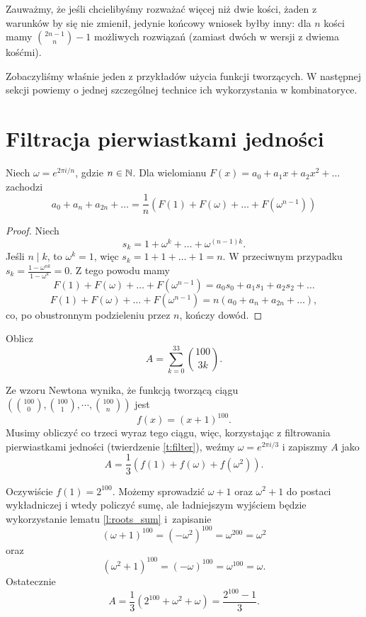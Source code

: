 \documentclass{scrartcl}
\begin{document}
    Zauważmy, że jeśli chcielibyśmy rozważać więcej niż dwie kości, żaden z warunków by się nie zmienił, jedynie końcowy wniosek byłby inny: dla $n$ kości mamy $\binom{2n - 1}{n} - 1$ możliwych rozwiązań (zamiast dwóch w wersji z dwiema kośćmi).

    Zobaczyliśmy właśnie jeden z przykładów użycia funkcji tworzących. W następnej sekcji powiemy o jednej szczególnej technice ich wykorzystania w kombinatoryce.

\section{Filtracja pierwiastkami jedności}
    \begin{theorem}
        \label{t:filter}
        Niech $\omega = e^{2\pi i/n}$, gdzie $n \in \mathbb N$. Dla wielomianu $F(x) = a_0 + a_1x + a_2x^2 + \ldots$ zachodzi
        $$ a_0 + a_n + a_{2n} + \ldots = \frac{1}{n}\left(F(1) + F(\omega) + \ldots + F(\omega^{n - 1})\right) $$
    \end{theorem}
    \begin{proof}
        Niech
        $$ s_k = 1 + \omega^k + \ldots + \omega^{(n - 1)k}. $$
        Jeśli $n \mid k$, to $\omega^k = 1$, więc $s_k = 1 + 1 + \ldots + 1 = n$. W przeciwnym przypadku $s_k = \frac{1 - \omega^{nk}}{1 - \omega^k} = 0$.
        Z tego powodu mamy
        $$ F(1) + F(\omega) + \ldots + F(\omega^{n - 1}) = a_0s_0 + a_1s_1 + a_2s_2 + \ldots $$
        $$ F(1) + F(\omega) + \ldots + F(\omega^{n - 1}) = n(a_0 + a_n + a_{2n} + \ldots), $$
        co, po obustronnym podzieleniu przez $n$, kończy dowód.
    \end{proof}

    \begin{example}
        Oblicz $$ A = \sum_{k = 0}^{33} \binom{100}{3k}. $$
    \end{example}
    \begin{solution}
        Ze wzoru Newtona wynika, że funkcją tworzącą ciągu $\left(\binom{100}{0}, \binom{100}{1}, \cdots, \binom{100}{n}\right)$ jest
        $$ f(x) = (x + 1)^{100}. $$
        Musimy obliczyć co trzeci wyraz tego ciągu, więc, korzystając z filtrowania pierwiastkami jedności (twierdzenie \ref{t:filter}), weźmy $\omega = e^{2\pi i /3}$ i zapiszmy $A$ jako
        $$ A = \frac{1}{3}\left(f(1) + f(\omega) + f(\omega^2)\right). $$

        Oczywiście $f(1) = 2^{100}$. Możemy sprowadzić $\omega + 1$ oraz $\omega^2 + 1$ do postaci wykładniczej i wtedy policzyć sumę, ale ładniejszym wyjściem będzie wykorzystanie lematu \ref{l:roots_sum} i~zapisanie
        $$ (\omega + 1)^{100} = (-\omega^2)^{100} = \omega^{200} = \omega^2 $$
        oraz
        $$ (\omega^2 + 1)^{100} = (-\omega)^{100} = \omega^{100} = \omega. $$
        Ostatecznie
        $$ A = \frac{1}{3}\left(2^{100} + \omega^2 + \omega\right) = \frac{2^{100} - 1}{3}. $$

    \end{solution}
\end{document}

